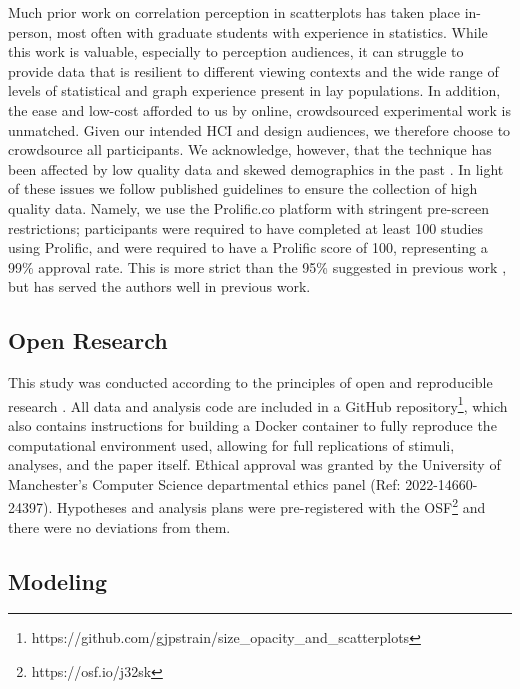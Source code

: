 \documentclass[sigconf]{acmart}
\begin{document}
Much prior work on correlation perception in scatterplots has taken
place in-person, most often with graduate students with experience in
statistics. While this work is valuable, especially to perception
audiences, it can struggle to provide data that is resilient to
different viewing contexts and the wide range of levels of statistical
and graph experience present in lay populations. In addition, the ease
and low-cost afforded to us by online, crowdsourced experimental work is
unmatched. Given our intended HCI and design audiences, we therefore
choose to crowdsource all participants. We acknowledge, however, that
the technique has been affected by low quality data and skewed
demographics in the past
\citep{chmielewski_2020, charalambides_2021, peer_2021}. In light of
these issues we follow published guidelines \citep{peer_2021} to ensure
the collection of high quality data. Namely, we use the Prolific.co
platform \citep{prolific} with stringent pre-screen restrictions;
participants were required to have completed at least 100 studies using
Prolific, and were required to have a Prolific score of 100,
representing a 99\% approval rate. This is more strict than the 95\%
suggested in previous work \citep{peer_2021}, but has served the authors
well in previous work.

\hypertarget{sec-open-research}{%
\subsection{Open Research}\label{sec-open-research}}

This study was conducted according to the principles of open and
reproducible research \citep{ayris_2018}. All data and analysis code are
included in a GitHub repository\footnote{https://github.com/gjpstrain/size\_opacity\_and\_scatterplots},
which also contains instructions for building a Docker container
\citep{merkel_2014} to fully reproduce the computational environment
used, allowing for full replications of stimuli, analyses, and the paper
itself. Ethical approval was granted by the University of Manchester's
Computer Science departmental ethics panel (Ref: 2022-14660-24397).
Hypotheses and analysis plans were pre-registered with the
OSF\footnote{https://osf.io/j32sk} and there were no deviations from
them.

\hypertarget{sec-gen-modelling}{%
\subsection{Modeling}\label{sec-gen-modelling}}
\end{document}
